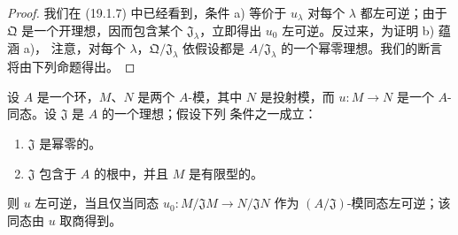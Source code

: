 \begin{proof}
我们在 (19.1.7) 中已经看到，条件 a) 等价于 $u_\lambda$ 对每个 $\lambda$
都左可逆；由于 $\mathfrak Q$ 是一个开理想，因而包含某个
$\mathfrak J_\lambda$，立即得出 $u_0$ 左可逆。反过来，为证明 b) 蕴涵 a)，
注意，对每个 $\lambda$，$\mathfrak Q/\mathfrak J_\lambda$ 依假设都是
$A/\mathfrak J_\lambda$ 的一个幂零理想。我们的断言将由下列命题得出。
\end{proof}

\begin{proposition}[19.1.10]
\label{0.19.1.10-fr}
设 $A$ 是一个环，$M$、$N$ 是两个 $A$-模，其中 $N$ 是投射模，而
$u:M\to N$ 是一个 $A$-同态。设 $\mathfrak J$ 是 $A$ 的一个理想；假设下列
条件之一成立：
\begin{enumerate}
  \item[(i)] $\mathfrak J$ 是幂零的。
  \item[(ii)] $\mathfrak J$ 包含于 $A$ 的根中，并且 $M$ 是有限型的。
\end{enumerate}
则 $u$ 左可逆，当且仅当同态 $u_0:M/\mathfrak JM\to N/\mathfrak JN$ 作为
$(A/\mathfrak J)$-模同态左可逆；该同态由 $u$ 取商得到。
\end{proposition}

